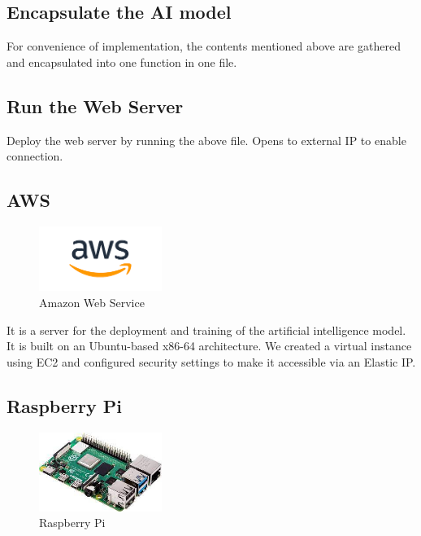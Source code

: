 \subsection{\textbf{Encapsulate the AI model}}
For convenience of implementation, the contents mentioned above are gathered and encapsulated into one function in one file.\\
\subsection{\textbf{Run the Web Server}}
Deploy the web server by running the above file. Opens to external IP to enable connection.\\

\subsection{\textbf{AWS}}

\begin{figure}[htp]
\centering
\includegraphics[width=4cm]{images/aws.png}
\caption{Amazon Web Service}
\label{fig:aws}
\end{figure}

It is a server for the deployment and training of the artificial intelligence model. It is built on an Ubuntu-based x86-64 architecture. We created a virtual instance using EC2 and configured security settings to make it accessible via an Elastic IP.\\

\subsection{\textbf{Raspberry Pi}}

\begin{figure}[htp]
\centering
\includegraphics[width=4cm]{images/raspberrypi.jpeg}
\caption{Raspberry Pi}
\label{fig:raspberryPi}
\end{figure}

